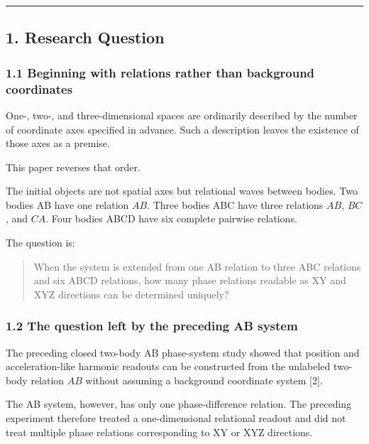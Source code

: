 \documentclass[
  10pt,
  a4paper,
]{article}
\begin{document}
\begin{center}\rule{0.5\linewidth}{0.5pt}\end{center}

\subsection{1. Research Question}\label{research-question}

\subsubsection{1.1 Beginning with relations rather than background
coordinates}\label{beginning-with-relations-rather-than-background-coordinates}

One-, two-, and three-dimensional spaces are ordinarily described by the
number of coordinate axes specified in advance. Such a description
leaves the existence of those axes as a premise.

This paper reverses that order.

The initial objects are not spatial axes but relational waves between
bodies. Two bodies AB have one relation \(AB\). Three bodies ABC have
three relations \(AB\), \(BC\), and \(CA\). Four bodies ABCD have six
complete pairwise relations.

The question is:

\begin{quote}
When the system is extended from one AB relation to three ABC relations
and six ABCD relations, how many phase relations readable as XY and XYZ
directions can be determined uniquely?
\end{quote}

\subsubsection{1.2 The question left by the preceding AB
system}\label{the-question-left-by-the-preceding-ab-system}

The preceding closed two-body AB phase-system study showed that position
and acceleration-like harmonic readouts can be constructed from the
unlabeled two-body relation \(AB\) without assuming a background
coordinate system {[}2{]}.

The AB system, however, has only one phase-difference relation. The
preceding experiment therefore treated a one-dimensional relational
readout and did not treat multiple phase relations corresponding to XY
or XYZ directions.
\end{document}
